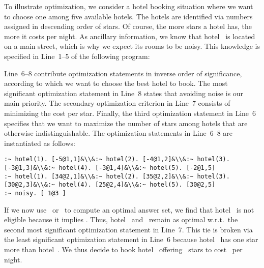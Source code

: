 \begin{example}\label{ex:opt}
To illustrate optimization, we consider a hotel booking situation
where we want to choose one among five available hotels.
The hotels are identified via numbers assigned in descending order of stars.
Of course, the more stars a hotel has, the more it costs per night.
As ancillary information, we know that hotel~ is located
on a main street, which is why we expect its rooms to be noisy.
This knowledge is specified in Line~1--5 of the following program:
%

%
Line~6--8 contribute optimization statements in inverse order of significance,
according to which we want to choose the best hotel to book.
The most significant optimization statement in Line~8 states that
avoiding noise is our main priority.
The secondary optimization criterion in Line~7 consists of
minimizing the cost per star.
Finally, the third optimization statement in Line~6 specifies that we want
to maximize the number of stars among hotels that are otherwise indistinguishable.
The optimization statements in Line~6--8 are instantiated as follows:%
%
\begin{lstlisting}[firstnumber=6,breakindent=0pt,escapechar=&]
:~ hotel(1). [-5@1,1]&\\&:~ hotel(2). [-4@1,2]&\\&:~ hotel(3). [-3@1,3]&\\&:~ hotel(4). [-3@1,4]&\\&:~ hotel(5). [-2@1,5]
:~ hotel(1). [34@2,1]&\\&:~ hotel(2). [35@2,2]&\\&:~ hotel(3). [30@2,3]&\\&:~ hotel(4). [25@2,4]&\\&:~ hotel(5). [30@2,5]
:~ noisy. [ 1@3 ]
\end{lstlisting}
If we now use \clasp\ or \clingo\ to compute an optimal answer set,%
we find that hotel~ is not eligible because it implies .
Thus, hotel~ and~ remain as optimal w.r.t.\ the second most
significant optimization statement in Line~7.
This tie is broken via the least significant optimization statement in Line~6
because hotel~ has one star more than hotel~.
We thus decide to book hotel~ offering~ stars
to cost~ per night.
\end{example}


